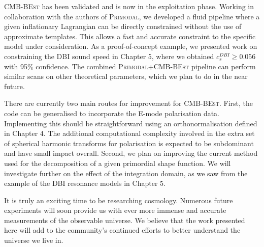 \textsc{CMB-BEst} has been validated and is now in the exploitation phase. Working in collaboration with the authors of \textsc{Primodal}, we developed a fluid pipeline where a given inflationary Lagrangian can be directly constrained without the use of approximate templates. This allows a fast and accurate constraint to the specific model under consideration. As a proof-of-concept example, we presented work on constraining the DBI sound speed in Chapter 5, where we obtained $c_s^{DBI} \ge 0.056$ with 95\% confidence. The combined \textsc{Primodal}+\textsc{CMB-BEst} pipeline can perform similar scans on other theoretical parameters, which we plan to do in the near future.

There are currently two main routes for improvement for \textsc{CMB-BEst}. First, the code can be generalised to incorporate the E-mode polarisation data. Implementing this should be straightforward using an orthonormalisation defined in Chapter 4. The additional computational complexity involved in the extra set of spherical harmonic transforms for polarisation is expected to be subdominant and have small impact overall. Second, we plan on improving the current method used for the decomposition of a given primordial shape function. We will investigate further on the effect of the integration domain, as we saw from the example of the DBI resonance models in Chapter 5.

It is truly an exciting time to be researching cosmology. Numerous future experiments will soon provide us with ever more immense and accurate measurements of the observable universe. We believe that the work presented here will add to the community's continued efforts to better understand the universe we live in.